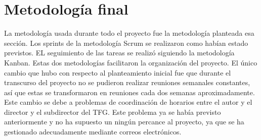 \chapter{Metodología final}

La metodología usada durante todo el proyecto fue la metodología planteada esa sección. Los sprints de la metodología Scrum se realizaron como habían estado previstos. EL seguimiento de las tareas se realizó siguiendo la metodología Kanban. Estas dos metodologías facilitaron la organización del proyecto. El único cambio que hubo con respecto al planteamiento inicial fue que durante el transcurso del proyecto no se pudieron realizar reuniones semanales constantes, así que estas se transformaron en reuniones cada dos semanas aproximadamente. Este cambio se debe a problemas de coordinación de horarios entre el autor y el director y el subdirector del TFG. Este problema ya se había previsto anteriormente y no ha supuesto un ningún percance al proyecto, ya que se ha gestionado adecuadamente mediante correos electrónicos. 
